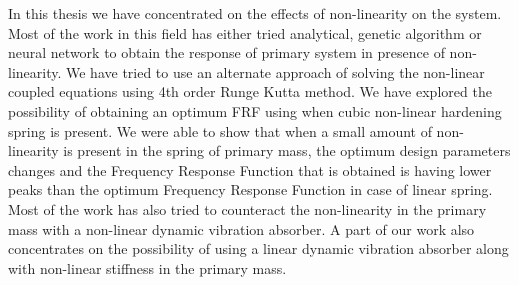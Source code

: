 In this thesis we have concentrated on the effects of non-linearity on the system. Most of the work in this field has either tried analytical, genetic algorithm or neural network to obtain the response of primary system in presence of non-linearity. We have tried to use an alternate approach of solving the non-linear coupled equations using 4th order Runge Kutta method. We have explored the possibility of obtaining an optimum FRF using when cubic non-linear hardening spring is present. We were able to show that when a small amount of non-linearity is present in the spring of primary mass, the optimum design parameters changes and the Frequency Response Function that is obtained is having lower peaks than the optimum Frequency Response Function in case of linear spring.
Most of the work has also tried to counteract the non-linearity in the primary mass with a non-linear dynamic vibration absorber. A part of our work also concentrates on the possibility of using a linear dynamic vibration absorber along with non-linear stiffness in the primary mass. 
%